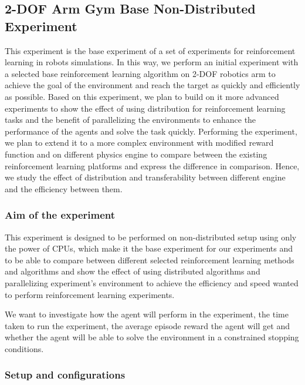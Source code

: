 
\subsection{2-DOF Arm Gym Base Non-Distributed Experiment}

This experiment is the base experiment of a set of experiments for reinforcement learning in robots simulations.
In this way, we perform an initial experiment with a selected base reinforcement learning algorithm on 2-DOF robotics arm to achieve the goal of the environment and reach the target as quickly and efficiently as possible.
Based on this experiment, we plan to build on it more advanced experiments to show the effect of using distribution for reinforcement learning tasks and the benefit of parallelizing the environments to enhance the performance of the agents and solve the task quickly. Performing the experiment, we plan to extend it to a more complex environment with modified reward function and on different physics engine to compare between the existing reinforcement learning platforms and express the difference in comparison. Hence, we study the effect of distribution and transferability between different engine and the efficiency between them.

\subsubsection{Aim of the experiment}

This experiment is designed to be performed on non-distributed setup using only the power of CPUs, which make it the base experiment for our experiments and to be able to compare between different selected reinforcement learning methods and algorithms and show the effect of using distributed algorithms and parallelizing experiment's environment to achieve the efficiency and speed wanted to perform reinforcement learning experiments. 

We want to investigate how the agent will perform in the experiment, the time taken to run the experiment, the average episode reward the agent will get and whether the agent will be able to solve the environment in a constrained stopping conditions.

\subsubsection{Setup and configurations}

